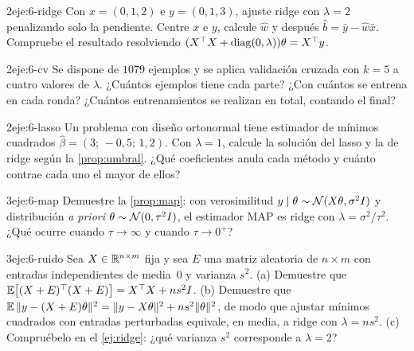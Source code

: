 \begin{ejercicio}{2}{eje:6-ridge}
Con $x=(0,1,2)$ e $y=(0,1,3)$, ajuste ridge con $\lambda=2$ penalizando solo la pendiente. Centre $x$ e $y$, calcule $\hat w$ y después $\hat b=\bar y-\hat w\bar x$. Compruebe el resultado resolviendo $(X^{\top}X+\operatorname{diag}(0,\lambda))\theta=X^{\top}y$.
\end{ejercicio}

\begin{ejercicio}{2}{eje:6-cv}
Se dispone de $1079$ ejemplos y se aplica validación cruzada con $k=5$ a cuatro valores de $\lambda$. ¿Cuántos ejemplos tiene cada parte? ¿Con cuántos se entrena en cada ronda? ¿Cuántos entrenamientos se realizan en total, contando el final?
\end{ejercicio}

\begin{ejercicio}{2}{eje:6-lasso}
Un problema con diseño ortonormal tiene estimador de mínimos cuadrados $\hat\beta=(3;\,-0{,}5;\,1{,}2)$. Con $\lambda=1$, calcule la solución del lasso y la de ridge según la \cref{prop:umbral}. ¿Qué coeficientes anula cada método y cuánto contrae cada uno el mayor de ellos?
\end{ejercicio}

\begin{ejercicio}{3}{eje:6-map}
Demuestre la \cref{prop:map}: con verosimilitud $y\mid\theta\sim\mathcal{N}(X\theta,\sigma^{2}I)$ y distribución \emph{a priori} $\theta\sim\mathcal{N}(0,\tau^{2}I)$, el estimador MAP es ridge con $\lambda=\sigma^{2}/\tau^{2}$. ¿Qué ocurre cuando $\tau\to\infty$ y cuando $\tau\to 0^{+}$?
\end{ejercicio}

\begin{ejercicio}{3}{eje:6-ruido}
Sea $X\in\mathbb{R}^{n\times m}$ fija y sea $E$ una matriz aleatoria de $n\times m$ con entradas independientes de media~0 y varianza $s^{2}$. (a) Demuestre que $\mathbb{E}\bigl[(X+E)^{\top}(X+E)\bigr]=X^{\top}X+ns^{2}I$. (b) Demuestre que $\mathbb{E}\,\lVert y-(X+E)\theta\rVert^{2}=\lVert y-X\theta\rVert^{2}+ns^{2}\lVert\theta\rVert^{2}$, de modo que ajustar mínimos cuadrados con entradas perturbadas equivale, en media, a ridge con $\lambda=ns^{2}$. (c) Compruébelo en el \cref{ej:ridge}: ¿qué varianza $s^{2}$ corresponde a $\lambda=2$?
\end{ejercicio}
